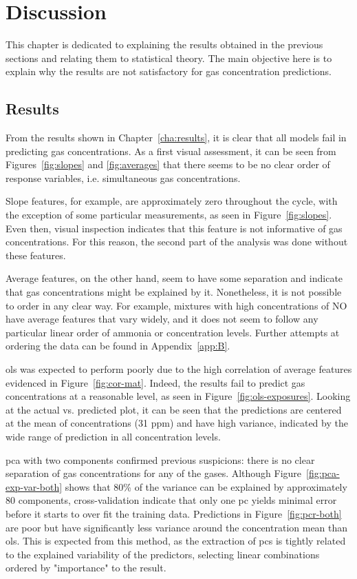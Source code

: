 \chapter{Discussion}
\label{cha:discussion}

This chapter is dedicated to explaining the results obtained in the previous sections and relating them to statistical theory. The main objective here is to explain why the results are not satisfactory for gas concentration predictions.

\section{Results}
\label{sec:discussion-results}

From the results shown in Chapter~\ref{cha:results}, it is clear that all models fail in predicting gas concentrations. As a first visual assessment, it can be seen from Figures~\ref{fig:slopes} and \ref{fig:averages} that there seems to be no clear order of response variables, i.e. simultaneous gas concentrations.

 Slope features, for example, are approximately zero throughout the cycle, with the exception of some particular measurements, as seen in Figure~\ref{fig:slopes}. Even then, visual inspection indicates that this feature is not informative of gas concentrations. For this reason, the second part of the analysis was done without these features.
 
 Average features, on the other hand, seem to have some separation and indicate that gas concentrations might be explained by it. Nonetheless, it is not possible to order in any clear way. For example, mixtures with high concentrations of NO have average features that vary widely, and it does not seem to follow any particular linear order of ammonia or \nox concentration levels. Further attempts at ordering the data can be found in Appendix~\ref{app:B}. 
 
\acrlong{ols} was expected to perform poorly due to the high correlation of average features evidenced in Figure~\ref{fig:cor-mat}. Indeed, the results fail to predict gas concentrations at a reasonable level, as seen in Figure~\ref{fig:ols-exposures}. Looking at the actual vs. predicted plot, it can be seen that the predictions are centered at the mean of concentrations (31 ppm) and have high variance, indicated by the wide range of prediction in all concentration levels.

\acrshort{pca} with two components confirmed previous suspicions: there is no clear separation of gas concentrations for any of the gases. Although Figure~\ref{fig:pca-exp-var-both} shows that 80\% of the variance can be explained by approximately 80 components, cross-validation indicate that only one \acrshort{pc} yields minimal error before it starts to over fit the training data. Predictions in Figure~\ref{fig:pcr-both} are poor but have significantly less variance around the concentration mean than \acrshort{ols}. This is expected from this method, as the extraction of \acrshort{pc}s is tightly related to the explained variability of the predictors, selecting linear combinations ordered by "importance" to the result.

